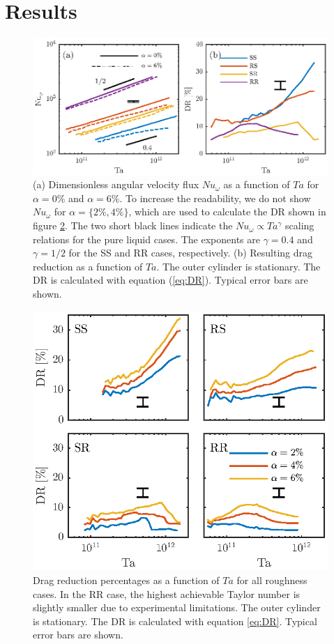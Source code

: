 \documentclass{jfm}
\newcommand{\Ta}{T\!a}
\newcommand{\Nuw}{N\!u_{\omega}}
\begin{document}
\section{Results}
\begin{figure}
\centering 
\includegraphics[width = 0.8\linewidth]{fig2}
\caption{(a) Dimensionless angular velocity flux $\Nuw$ as a function of $\Ta$ for $\alpha=0\%$ and $\alpha=6\%$. To increase the readability, we do not show $\Nuw$ for $\alpha=\{2\%,4\%\}$, which are used to calculate the DR shown in figure \ref{Chap_Seven_fig:torque}. The two short black lines indicate  the $\Nuw\propto\Ta^{\gamma}$ scaling relations for the pure liquid cases. The exponents are $\gamma=0.4$ and $\gamma=1/2$ for the SS and RR cases, respectively. {(b)} Resulting drag reduction as a function of $Ta$. The outer cylinder is stationary. The DR is calculated with equation (\ref{eq:DR}). Typical error bars are shown.}
\label{Chap_Seven_fig:torque_all}
\end{figure}
\begin{figure}
\centering 
\includegraphics[width = 0.8\linewidth]{fig3}
\caption{Drag reduction percentages as a function of $\Ta$ for all roughness cases. In the RR case, the highest achievable Taylor number is slightly smaller due to experimental limitations. The outer cylinder is stationary. The DR is calculated with equation \ref{eq:DR}. Typical error bars are shown.}
\label{Chap_Seven_fig:torque}
\end{figure}
\end{document}
